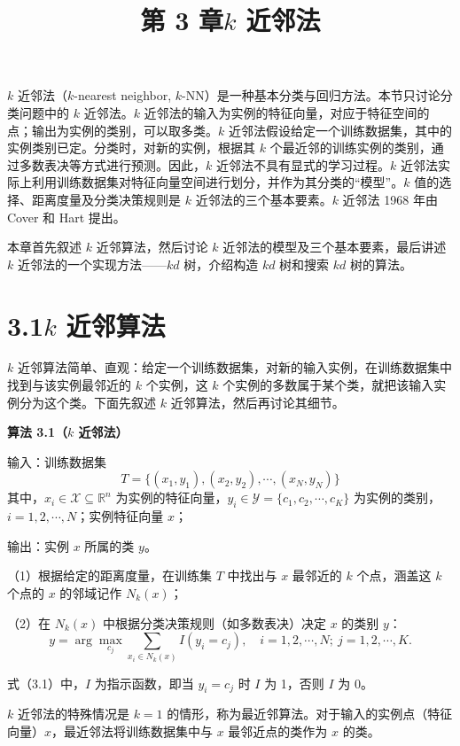 \documentclass[UTF8,12pt,a4paper,fontset=fandol]{ctexart}
\title{第 3 章\quad $k$ 近邻法}
\author{}
\date{}
\begin{document}
\maketitle

$k$ 近邻法（$k$-nearest neighbor, $k$-NN）是一种基本分类与回归方法。本节只讨论分类问题中的 $k$ 近邻法。$k$ 近邻法的输入为实例的特征向量，对应于特征空间的点；输出为实例的类别，可以取多类。$k$ 近邻法假设给定一个训练数据集，其中的实例类别已定。分类时，对新的实例，根据其 $k$ 个最近邻的训练实例的类别，通过多数表决等方式进行预测。因此，$k$ 近邻法不具有显式的学习过程。$k$ 近邻法实际上利用训练数据集对特征向量空间进行划分，并作为其分类的“模型”。$k$ 值的选择、距离度量及分类决策规则是 $k$ 近邻法的三个基本要素。$k$ 近邻法 1968 年由 Cover 和 Hart 提出。

本章首先叙述 $k$ 近邻算法，然后讨论 $k$ 近邻法的模型及三个基本要素，最后讲述 $k$ 近邻法的一个实现方法——$kd$ 树，介绍构造 $kd$ 树和搜索 $kd$ 树的算法。

\section*{3.1\quad $k$ 近邻算法}

$k$ 近邻算法简单、直观：给定一个训练数据集，对新的输入实例，在训练数据集中找到与该实例最邻近的 $k$ 个实例，这 $k$ 个实例的多数属于某个类，就把该输入实例分为这个类。下面先叙述 $k$ 近邻算法，然后再讨论其细节。

\noindent\textbf{算法 3.1（$k$ 近邻法）}

\noindent 输入：训练数据集
\[
T=\{(x_1,y_1),(x_2,y_2),\cdots,(x_N,y_N)\}
\]
其中，$x_i\in\mathcal{X}\subseteq \mathbb{R}^n$ 为实例的特征向量，$y_i\in\mathcal{Y}=\{c_1,c_2,\cdots,c_K\}$ 为实例的类别，$i=1,2,\cdots,N$；实例特征向量 $x$；

\noindent 输出：实例 $x$ 所属的类 $y$。

（1）根据给定的距离度量，在训练集 $T$ 中找出与 $x$ 最邻近的 $k$ 个点，涵盖这 $k$ 个点的 $x$ 的邻域记作 $N_k(x)$；

（2）在 $N_k(x)$ 中根据分类决策规则（如多数表决）决定 $x$ 的类别 $y$：
\begin{equation}
y=\arg\max_{c_j}\sum_{x_i\in N_k(x)} I(y_i=c_j),\quad i=1,2,\cdots,N;\ j=1,2,\cdots,K.
\tag{3.1}
\end{equation}

式（3.1）中，$I$ 为指示函数，即当 $y_i=c_j$ 时 $I$ 为 1，否则 $I$ 为 0。

$k$ 近邻法的特殊情况是 $k=1$ 的情形，称为最近邻算法。对于输入的实例点（特征向量）$x$，最近邻法将训练数据集中与 $x$ 最邻近点的类作为 $x$ 的类。
\end{document}
